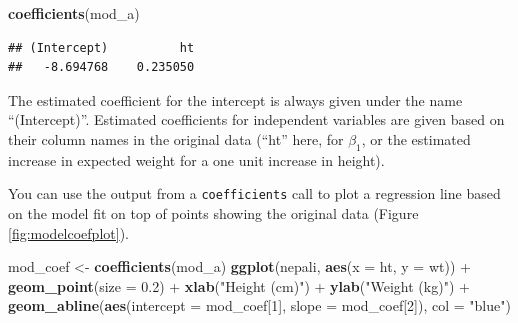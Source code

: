 \documentclass[]{book}
\makeatletter
\newenvironment{Shaded}{\begin{snugshade}}{\end{snugshade}}
\newcommand{\KeywordTok}[1]{\textcolor[rgb]{0.13,0.29,0.53}{\textbf{{#1}}}}
\newcommand{\DataTypeTok}[1]{\textcolor[rgb]{0.13,0.29,0.53}{{#1}}}
\newcommand{\DecValTok}[1]{\textcolor[rgb]{0.00,0.00,0.81}{{#1}}}
\newcommand{\FloatTok}[1]{\textcolor[rgb]{0.00,0.00,0.81}{{#1}}}
\newcommand{\StringTok}[1]{\textcolor[rgb]{0.31,0.60,0.02}{{#1}}}
\newcommand{\NormalTok}[1]{{#1}}
\newenvironment{kframe}{%
\medskip{}
\setlength{\fboxsep}{.8em}
 \def\at@end@of@kframe{}%
 \ifinner\ifhmode%
  \def\at@end@of@kframe{\end{minipage}}%
  \begin{minipage}{\columnwidth}%
 \fi\fi%
 \def\FrameCommand##1{\hskip\@totalleftmargin \hskip-\fboxsep
 \colorbox{shadecolor}{##1}\hskip-\fboxsep
     \hskip-\linewidth \hskip-\@totalleftmargin \hskip\columnwidth}%
 \MakeFramed {\advance\hsize-\width
   \@totalleftmargin\z@ \linewidth\hsize
   \@setminipage}}%
 {\par\unskip\endMakeFramed%
 \at@end@of@kframe}
\renewenvironment{Shaded}{\begin{kframe}}{\end{kframe}}
\makeatother
\begin{document}
\begin{Shaded}
\begin{Highlighting}[]
\KeywordTok{coefficients}\NormalTok{(mod_a)}
\end{Highlighting}
\end{Shaded}

\begin{verbatim}
## (Intercept)          ht 
##   -8.694768    0.235050
\end{verbatim}

The estimated coefficient for the intercept is always given under the
name ``(Intercept)''. Estimated coefficients for independent variables
are given based on their column names in the original data (``ht'' here,
for \(\beta_1\), or the estimated increase in expected weight for a one
unit increase in height).

You can use the output from a \texttt{coefficients} call to plot a
regression line based on the model fit on top of points showing the
original data (Figure \ref{fig:modelcoefplot}).

\begin{Shaded}
\begin{Highlighting}[]
\NormalTok{mod_coef <-}\StringTok{ }\KeywordTok{coefficients}\NormalTok{(mod_a)}
\KeywordTok{ggplot}\NormalTok{(nepali, }\KeywordTok{aes}\NormalTok{(}\DataTypeTok{x =} \NormalTok{ht, }\DataTypeTok{y =} \NormalTok{wt)) +}\StringTok{ }
\StringTok{  }\KeywordTok{geom_point}\NormalTok{(}\DataTypeTok{size =} \FloatTok{0.2}\NormalTok{) +}\StringTok{ }
\StringTok{  }\KeywordTok{xlab}\NormalTok{(}\StringTok{"Height (cm)"}\NormalTok{) +}\StringTok{ }\KeywordTok{ylab}\NormalTok{(}\StringTok{"Weight (kg)"}\NormalTok{) +}\StringTok{ }
\StringTok{  }\KeywordTok{geom_abline}\NormalTok{(}\KeywordTok{aes}\NormalTok{(}\DataTypeTok{intercept =} \NormalTok{mod_coef[}\DecValTok{1}\NormalTok{],}
                  \DataTypeTok{slope =} \NormalTok{mod_coef[}\DecValTok{2}\NormalTok{]), }\DataTypeTok{col =} \StringTok{"blue"}\NormalTok{)}
\end{Highlighting}
\end{Shaded}
\end{document}
